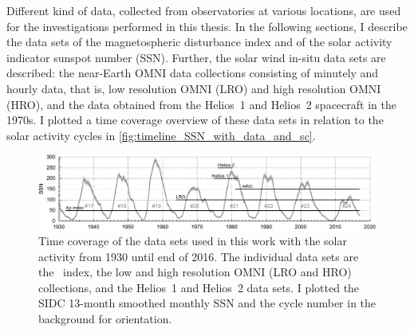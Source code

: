 Different kind of data, collected from observatories at various locations, are used for the investigations performed in this thesis. In the following sections, I describe the data sets of the magnetospheric disturbance index \Kp{} and of the solar activity indicator sunspot number (SSN). Further, the solar wind in-situ data sets are described: the near-Earth OMNI data collections consisting of minutely and hourly data, that is, low resolution OMNI (LRO) and high resolution OMNI (HRO), and the data obtained from the Helios~1 and Helios~2 spacecraft in the 1970s. I plotted a time coverage overview of these data sets in relation to the solar activity cycles in \autoref{fig:timeline_SSN_with_data_and_sc}.\\
\begin{figure}[htb]
	\centering
	\includegraphics[width=\textwidth]{figures_of_mine/gnuplots/timeline_SSN_with_data_and_sc.pdf}
	\caption[]
	{Time coverage of the data sets used in this work with the solar activity from 1930 until end of 2016. The individual data sets are the \Kp~index, the low and high resolution OMNI (LRO and HRO) collections, and the Helios~1 and Helios~2 data sets. I plotted the SIDC 13-month smoothed monthly SSN and the cycle number in the background for orientation.}
	\label{fig:timeline_SSN_with_data_and_sc}
\end{figure}
% 


